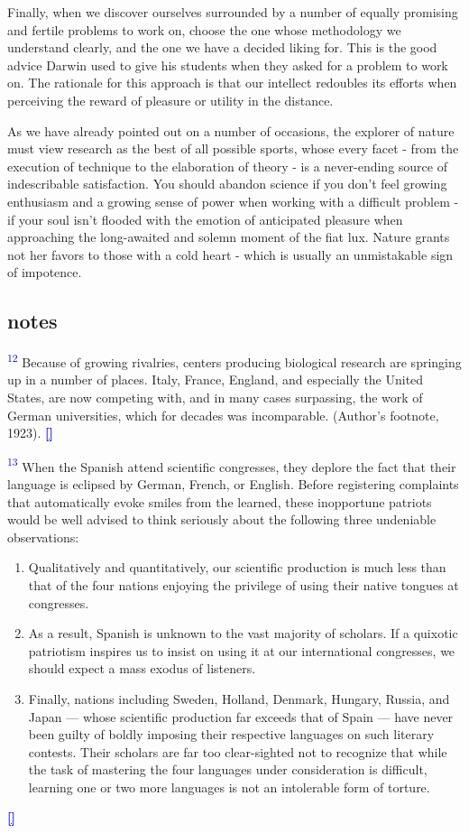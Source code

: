 \documentclass{article}
\newcommand{\notetext}[2]{
 \par\noindent
 \hypertarget{note:#1}{\textsuperscript{\textcolor{blue}{#1}}} #2
 \hyperlink{ref:#1}{\textcolor{blue}{\textbf{[\textuparrow]}}}
 \par\vspace{1em}
}
\begin{document}
Finally, when we discover ourselves surrounded by a number of equally promising and fertile problems to work on, choose the one whose methodology we understand clearly, and the one we have a decided liking for. This is the good advice Darwin used to give his students when they asked for a problem to work on. The rationale for this approach is that our intellect redoubles its efforts when perceiving the reward of pleasure or utility in the distance.

As we have already pointed out on a number of occasions, the explorer of nature must view research as the best of all possible sports, whose every facet - from the execution of technique to the elaboration of theory - is a never-ending source of indescribable satisfaction. You should abandon science if you don’t feel growing enthusiasm and a growing sense of power when working with a difficult problem - if your soul isn’t flooded with the emotion of anticipated pleasure when approaching the long-awaited and solemn moment of the fiat lux. Nature grants not her favors to those with a cold heart - which is usually an unmistakable sign of impotence.

\subsection*{notes}


\notetext{12}{ Because of growing rivalries, centers producing biological research are springing up in a number of places. Italy, France, England, and especially the United States, are now competing with, and in many cases surpassing, the work of German universities, which for decades was incomparable. (Author’s footnote, 1923). }

\notetext{13}{ When the Spanish attend scientific congresses, they deplore the fact that their language is eclipsed by German, French, or English. Before registering complaints that automatically evoke smiles from the learned, these inopportune patriots would be well advised to think seriously about the following three undeniable observations:

\begin{enumerate}  
    \item Qualitatively and quantitatively, our scientific production is much less than that of the four nations enjoying the privilege of using their native tongues at congresses.  
    \item As a result, Spanish is unknown to the vast majority of scholars. If a quixotic patriotism inspires us to insist on using it at our international congresses, we should expect a mass exodus of listeners.
    \item Finally, nations including Sweden, Holland, Denmark, Hungary, Russia, and Japan — whose scientific production far exceeds that of Spain — have never been guilty of boldly imposing their respective languages on such literary contests. Their scholars are far too clear-sighted not to recognize that while the task of mastering the four languages under consideration is difficult, learning one or two more languages is not an intolerable form of torture.
\end{enumerate}
}
\end{document}
